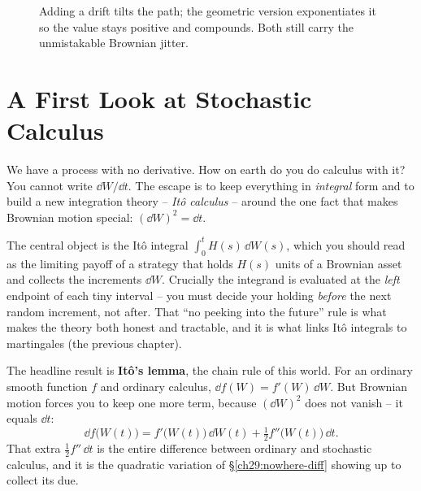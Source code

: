 \begin{figure}[H]
\centering
{}
\caption{Adding a drift tilts the path; the geometric version exponentiates it so
the value stays positive and compounds. Both still carry the unmistakable
Brownian jitter.}
\label{ch29:fig-drift}
\end{figure}

\section{A First Look at Stochastic Calculus}
\label{ch29:ito}

We have a process with no derivative. How on earth do you do calculus with it?
You cannot write $\dd W/\dd t$. The escape is to keep everything in
\emph{integral} form and to build a new integration theory -- \emph{It\^o
calculus} -- around the one fact that makes Brownian motion special:
$(\dd W)^2 = \dd t$.

The central object is the It\^o integral $\int_0^t H(s)\,\dd W(s)$, which you
should read as the limiting payoff of a strategy that holds $H(s)$ units of a
Brownian asset and collects the increments $\dd W$. Crucially the integrand is
evaluated at the \emph{left} endpoint of each tiny interval -- you must decide
your holding \emph{before} the next random increment, not after. That ``no
peeking into the future'' rule is what makes the theory both honest and
tractable, and it is what links It\^o integrals to martingales (the previous
chapter).

The headline result is \textbf{It\^o's lemma}, the chain rule of this world. For
an ordinary smooth function $f$ and ordinary calculus, $\dd f(W) = f'(W)\,\dd W$.
But Brownian motion forces you to keep one more term, because $(\dd W)^2$ does not
vanish -- it equals $\dd t$:
\[
  \boxed{\;\dd f\big(W(t)\big) = f'\big(W(t)\big)\,\dd W(t)
  + \tfrac12 f''\big(W(t)\big)\,\dd t.\;}
\]
That extra $\tfrac12 f''\,\dd t$ is the entire difference between ordinary and
stochastic calculus, and it is the quadratic variation of
\S\ref{ch29:nowhere-diff} showing up to collect its due.

